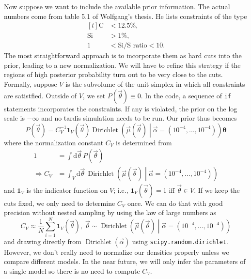 \documentclass[a4,12pt]{article}
\DeclareMathOperator{\Dirichlet}{Dirichlet}
\newcommand{\rmdx}[1]{\mbox{d} #1 \,} %
\newcommand{\vecalpha}{\ensuremath{\vec{\alpha}}}
\newcommand{\vecmu}{\ensuremath{\vec{\mu}}}
\newcommand{\vecth}{\ensuremath{{\vec{\theta}}}}
\begin{document}
Now suppose we want to include the available prior information. The
actual numbers come from table 5.1 of Wolfgang's thesis. He lists
constraints of the type
\begin{equation}
  \begin{aligned}[t]
    \label{eq:abundance-constraints}
    \mbox{C}  &< 12.5 \%,\\
    \mbox{Si} &>1 \%,\\
    1 &<\mbox{Si/S ratio} < 10 .
  \end{aligned}
\end{equation}
The most straightforward approach is to incorporate them as hard cuts
into the prior, leading to a new normalization. We will have to refine
this strategy if the regions of high posterior probability turn out to
be very close to the cuts. Formally, suppose $V$ is the subvolume of
the unit simplex in which all constraints are satistfied. Outside of
$V$, we set $P(\vecth) \equiv 0$. In the code, a sequence of
\texttt{if} statements incorporates the constraints. If any is
violated, the prior on the log scale is $-\infty$ and no tardis
simulation needs to be run. Our prior thus becomes
\begin{equation}
  \label{eq:abundances-prior}
  P(\vecth) = C_V^{-1} \mathbf{1}_V(\vecth) \Dirichlet\left(\vecmu(\vecth) \middle| \vecalpha=(10^{-4}, \dots, 10^{-4})\right) \boldsymbol{\theta}
\end{equation}
where the normalization constant $C_V$ is  determined from
\begin{equation}
  \begin{aligned}
    \label{eq:abundance-normalization}
    1 &= \int \rmdx{\vecth} P(\vecth)\\
    \Rightarrow C_V  &= \int_V \rmdx{\vecth} \Dirichlet\left(\vecmu(\vecth) \middle| \vecalpha=(10^{-4}, \dots, 10^{-4})\right)
  \end{aligned}
\end{equation}
and $\mathbf{1}_V$ is the indicator function on $V$; i.e.,
$\mathbf{1}_V(\vecth) = 1$ iff $\vecth \in V$.  If we keep the cuts
fixed, we only need to determine $C_V$ once. We can do that with good
precision without nested sampling by using the law of large numbers as
\begin{equation}
  \label{eq:abundances-large-numbers}
  C_V \approx \frac{1}{N} \sum_{i=1}^N \mathbf{1}_V(\vecth), \; \vecth \sim \Dirichlet\left(\vecmu(\vecth) \middle| \vecalpha=(10^{-4}, \dots, 10^{-4})\right)
\end{equation}
and drawing directly from $\Dirichlet(\vecalpha)$ using
\texttt{scipy.random.dirichlet}. However, we don't really need to
normalize our densities properly unless we compare different
models. In the near future, we will only infer the parameters of a
single model so there is no need to compute $C_V$.
\end{document}
